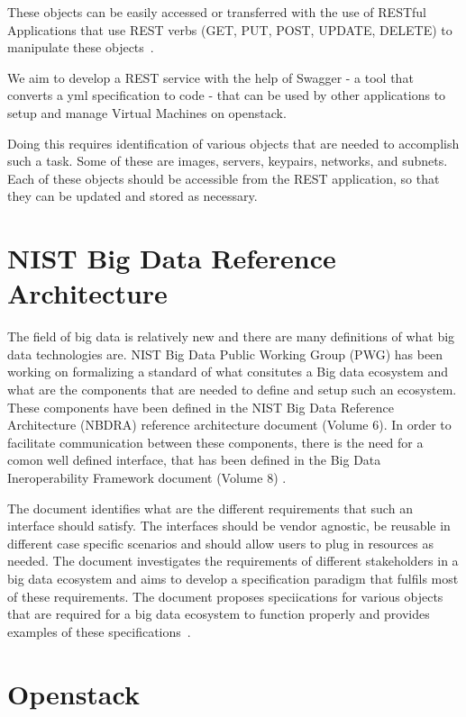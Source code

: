 These objects can be easily accessed or transferred with the use of
RESTful Applications that use REST verbs (GET, PUT, POST, UPDATE,
DELETE) to manipulate these objects~\cite{hid-sp18-503-REST}.

We aim to develop a REST service with the help of Swagger - a tool
that converts a yml specification to code - that can be used by other
applications to setup and manage Virtual Machines on openstack.

Doing this requires identification of various objects that are needed
to accomplish such a task. Some of these are images, servers,
keypairs, networks, and subnets. Each of these objects should be
accessible from the REST application, so that they can be updated and
stored as necessary.

\section{NIST Big Data Reference Architecture}
The field of big data is relatively new and there are many definitions
of what big data technologies are. NIST Big Data Public Working Group
(PWG) has been working on formalizing a standard of what consitutes a
Big data ecosystem and what are the components that are needed to
define and setup such an ecosystem. These components have been defined
in the NIST Big Data Reference Architecture (NBDRA) reference
architecture document (Volume 6). In order to facilitate communication
between these components, there is the need for a comon well defined
interface, that has been defined in the Big Data Ineroperability
Framework document (Volume 8)
\cite{hid-sp18-503-BDRA}.

The document identifies what are the different requirements that such
an interface should satisfy. The interfaces should be vendor agnostic,
be reusable in different case specific scenarios and should allow
users to plug in resources as needed. The document investigates the
requirements of different stakeholders in a big data ecosystem and
aims to develop a specification paradigm that fulfils most of these
requirements. The document proposes speciications for various objects
that are required for a big data ecosystem to function properly and
provides examples of these specifications~\cite{hid-sp18-503-BDRA}. 

\section{Openstack}

